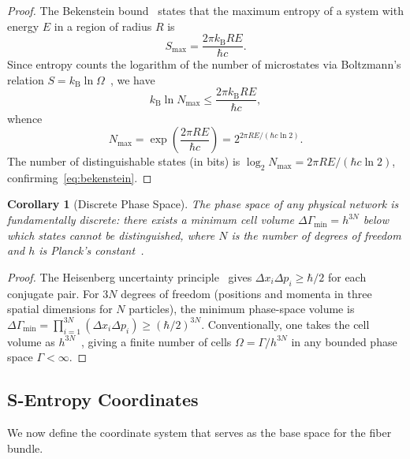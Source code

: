 \documentclass[11pt,twocolumn,a4paper]{article}
\newtheorem{corollary}[theorem]{Corollary}
\theoremstyle{definition}
\newcommand{\kB}{k_{\mathrm{B}}}
\begin{document}
\begin{proof}
The Bekenstein bound~\cite{bekenstein1973} states that the maximum entropy of a system
with energy $E$ in a region of radius $R$ is
\begin{equation}\label{eq:bek_entropy}
  S_{\max} = \frac{2\pi \kB R E}{\hbar c}.
\end{equation}
Since entropy counts the logarithm of the number of microstates via Boltzmann's relation
$S = \kB \ln \Omega$~\cite{boltzmann1877}, we have
\begin{equation}
  \kB \ln N_{\max} \leq \frac{2\pi \kB R E}{\hbar c},
\end{equation}
whence
\begin{equation}
  N_{\max} = \exp\!\left(\frac{2\pi R E}{\hbar c}\right) = 2^{2\pi R E / (\hbar c \ln 2)}.
\end{equation}
The number of distinguishable states (in bits) is $\log_2 N_{\max} = 2\pi R E / (\hbar c \ln 2)$,
confirming~\eqref{eq:bekenstein}.
\end{proof}

\begin{corollary}[Discrete Phase Space]\label{cor:discrete}
The phase space of any physical network is fundamentally discrete: there exists a
minimum cell volume $\Delta \Gamma_{\min} = h^{3N}$ below which states cannot be
distinguished, where $N$ is the number of degrees of freedom and $h$ is Planck's
constant~\cite{heisenberg1927,pathria2011}.
\end{corollary}

\begin{proof}
The Heisenberg uncertainty principle~\cite{heisenberg1927} gives $\Delta x_i \Delta p_i \geq \hbar/2$
for each conjugate pair. For $3N$ degrees of freedom (positions and momenta in three
spatial dimensions for $N$ particles), the minimum phase-space volume is
$\Delta \Gamma_{\min} = \prod_{i=1}^{3N}(\Delta x_i \Delta p_i) \geq (\hbar/2)^{3N}$.
Conventionally, one takes the cell volume as $h^{3N}$~\cite{pathria2011}, giving a
finite number of cells $\Omega = \Gamma / h^{3N}$ in any bounded phase space
$\Gamma < \infty$.
\end{proof}

\subsection{S-Entropy Coordinates}\label{sec:foundations:sentropy}

We now define the coordinate system that serves as the base space for the fiber bundle.
\end{document}
